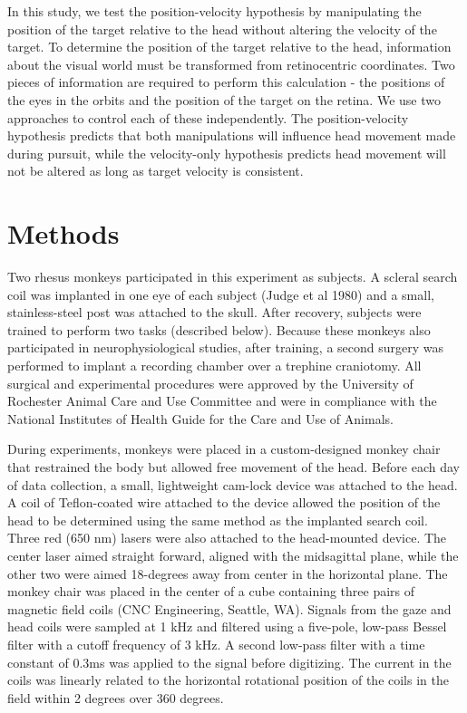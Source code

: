 \documentclass[12pt]{article}
\begin{document}
In this study, we test the position-velocity hypothesis by manipulating the position of the target relative to the head without altering the velocity of the target. To determine the position of the target relative to the head, information about the visual world must be transformed from retinocentric coordinates. Two pieces of information are required to perform this calculation - the positions of the eyes in the orbits and the position of the target on the retina. We use two approaches to control each of these independently. The position-velocity hypothesis predicts that both manipulations will influence head movement made during pursuit, while the velocity-only hypothesis predicts head movement will not be altered as long as target velocity is consistent.

\section{Methods}
Two rhesus monkeys participated in this experiment as subjects. A scleral search coil was implanted in one eye of each subject (Judge et al 1980) and a small, stainless-steel post was attached to the skull. After recovery, subjects were trained to perform two tasks (described below). Because these monkeys also participated in neurophysiological studies, after training, a second surgery was performed to implant a recording chamber over a trephine craniotomy. All surgical and experimental procedures were approved by the University of Rochester Animal Care and Use Committee and were in compliance with the National Institutes of Health Guide for the Care and Use of Animals.

During experiments, monkeys were placed in a custom-designed monkey chair that restrained the body but allowed free movement of the head.  Before each day of data collection, a small, lightweight cam-lock device was attached to the head. A coil of Teflon-coated wire attached to the device allowed the position of the head to be determined using the same method as the implanted search coil. Three red (650 nm) lasers were also attached to the head-mounted device. The center laser aimed straight forward, aligned with the midsagittal plane, while the other two were aimed 18-degrees away from center in the horizontal plane. The monkey chair was placed in the center of a cube containing three pairs of magnetic field coils (CNC Engineering, Seattle, WA). Signals from the gaze and head coils were sampled at 1 kHz and filtered using a five-pole, low-pass Bessel filter with a cutoff frequency of 3 kHz. A second low-pass filter with a time constant of 0.3ms was applied to the signal before digitizing. The current in the coils was linearly related to the horizontal rotational position of the coils in the field within 2 degrees over 360 degrees. 
\end{document}
